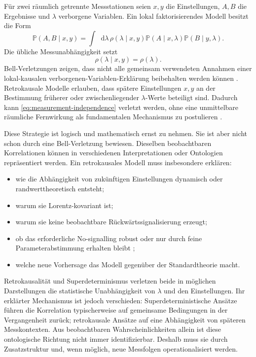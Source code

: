 \documentclass[11pt,a4paper]{article}
\theoremstyle{remark}
\newcommand{\dd}{\mathop{}\!\mathrm{d}}
\begin{document}
Für zwei räumlich getrennte Messstationen seien \(x,y\) die Einstellungen,
\(A,B\) die Ergebnisse und \(\lambda\) verborgene Variablen. Ein lokal
faktorisierendes Modell besitzt die Form
\begin{equation}
\label{eq:bell-factor}
 \mathbb P(A,B\mid x,y)
 =\int\dd\lambda\,
 \rho(\lambda\mid x,y)
 \mathbb P(A\mid x,\lambda)
 \mathbb P(B\mid y,\lambda).
\end{equation}
Die übliche Messunabhängigkeit setzt
\begin{equation}
\label{eq:measurement-independence}
  \rho(\lambda\mid x,y)=\rho(\lambda).
\end{equation}
Bell-Verletzungen zeigen, dass nicht alle gemeinsam verwendeten Annahmen
einer lokal-kausalen verborgenen-Variablen-Erklärung beibehalten werden
können \citep{Bell1964}. Retrokausale Modelle erlauben, dass spätere Einstellungen \(x,y\) an
der Bestimmung früherer oder zwischenliegender \(\lambda\)-Werte beteiligt
sind. Dadurch kann \cref{eq:measurement-independence} verletzt werden, ohne
eine unmittelbare räumliche Fernwirkung als fundamentalen Mechanismus zu
postulieren \citep{LeiferPusey2017,WhartonArgaman2020}.

Diese Strategie ist logisch und mathematisch ernst zu nehmen. Sie ist aber
nicht schon durch eine Bell-Verletzung bewiesen. Dieselben beobachtbaren
Korrelationen können in verschiedenen Interpretationen oder Ontologien
repräsentiert werden. Ein retrokausales Modell muss insbesondere erklären:
\begin{itemize}
  \item wie die Abhängigkeit von zukünftigen Einstellungen dynamisch oder
  randwerttheoretisch entsteht;
  \item warum sie Lorentz-kovariant ist;
  \item warum sie keine beobachtbare Rückwärtssignalisierung erzeugt;
  \item ob das erforderliche No-signalling robust oder nur durch feine
  Parameterabstimmung erhalten bleibt \citep{WoodSpekkens2015};
  \item welche neue Vorhersage das Modell gegenüber der Standardtheorie macht.
\end{itemize}

Retrokausalität und Superdeterminismus verletzen beide in möglichen
Darstellungen die statistische Unabhängigkeit von \(\lambda\) und den
Einstellungen. Ihr erklärter Mechanismus ist jedoch verschieden:
Superdeterministische Ansätze führen die Korrelation typischerweise auf
gemeinsame Bedingungen in der Vergangenheit zurück; retrokausale Ansätze auf
eine Abhängigkeit von späteren Messkontexten. Aus beobachtbaren
Wahrscheinlichkeiten allein ist diese ontologische Richtung nicht immer
identifizierbar. Deshalb muss sie durch Zusatzstruktur und, wenn möglich,
neue Messfolgen operationalisiert werden.
\end{document}
